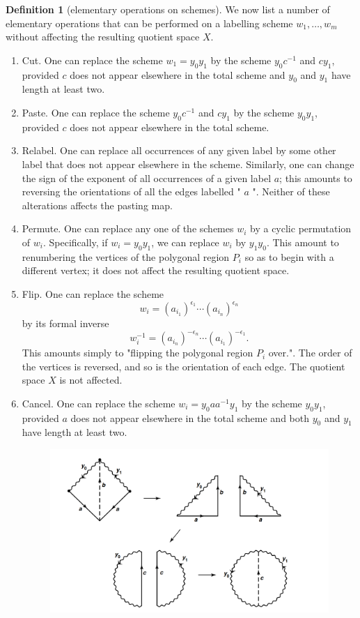 \documentclass[12pt,a4paper]{book}
\newenvironment{enu}{\begin{enumerate}[(1)]}{\end{enumerate}}
\theoremstyle{definition}
\newtheorem{defn}{Definition}[section]
\begin{document}
\begin{defn}[elementary operations on schemes]
    We now list a number of elementary operations that can be performed on a labelling scheme $w_1, \ldots, w_m$ without affecting the resulting quotient space $X$.
    \begin{enu}
        \item Cut. One can replace the scheme $w_1=y_0 y_1$ by the scheme $y_0 c^{-1}$ and $c y_1$, provided $c$ does not appear elsewhere in the total scheme and $y_0$ and $y_1$ have length at least two.
        \item Paste. One can replace the scheme $y_0 c^{-1}$ and $c y_1$ by the scheme $y_0 y_1$, provided $c$ does not appear elsewhere in the total scheme.
        \item Relabel. One can replace all occurrences of any given label by some other label that does not appear elsewhere in the scheme. Similarly, one can change the sign of the exponent of all occurrences of a given label $a$; this amounts to reversing the orientations of all the edges labelled " $a$ ". Neither of these alterations affects the pasting map.
        \item Permute. One can replace any one of the schemes $w_i$ by a cyclic permutation of $w_i$. Specifically, if $w_i=y_0 y_1$, we can replace $w_i$ by $y_1 y_0$. This amount to renumbering the vertices of the polygonal region $P_i$ so as to begin with a different vertex; it does not affect the resulting quotient space.
        \item Flip. One can replace the scheme
        $$
            w_i=\left(a_{i_1}\right)^{\epsilon_1} \cdots\left(a_{i_n}\right)^{\epsilon_n}
        $$
        by its formal inverse
        $$
            w_i^{-1}=\left(a_{i_n}\right)^{-\epsilon_n} \cdots\left(a_{i_1}\right)^{-\epsilon_1} .
        $$
        This amounts simply to "flipping the polygonal region $P_i$ over.". The order of the vertices is reversed, and so is the orientation of each edge. The quotient space $X$ is not affected.
        \item Cancel. One can replace the scheme $w_i=y_0 a a^{-1} y_1$ by the scheme $y_0 y_1$, provided $a$ does not appear elsewhere in the total scheme and both $y_0$ and $y_1$ have length at least two.
        \begin{figure}[H]
            \includegraphics[scale=0.5]{cancel.png}
            \centering
        \end{figure}
    \end{enu}
\end{defn}
\end{document}
